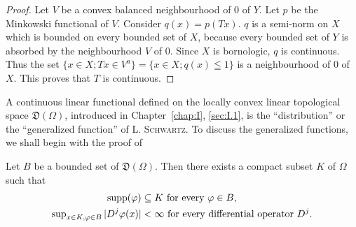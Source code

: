 \begin{proof}
 Let $V$ be a convex balanced neighbourhood of $0$ of $Y$. Let $p$ be the Minkowski functional of $V$. Consider $q(x) = p(Tx)$. $q$ is a semi-norm on $X$ which is bounded on every bounded set of $X$, because every bounded set of $Y$ is absorbed by the neighbourhood $V$ of $0$. Since $X$ is bornologic, $q$ is continuous. Thus the set $\{x \in X; Tx \in V^a\} = \{x \in X; q(x) \leqq 1\}$ is a neighbourhood of $0$ of $X$. This proves that $T$ is continuous. 
\end{proof}


\label{sec:I.8}

A continuous linear functional defined on the locally convex linear topological space $\mathfrak{D}(\Omega)$, introduced in Chapter~\ref{chap:I}, \ref{sec:I.1}, is the ``distribution'' or the ``generalized function'' of L. \textsc{Schwartz}. To discuss the generalized functions, we shall begin with the proof of 

\begin{theorem}\label{thm:I.8.Theorem.1} Let $B$ be a bounded set of $\mathfrak{D}(\Omega)$. Then there exists a compact subset $K$ of $\Omega$ such that 
\begin{align}
\operatorname{supp} (\varphi)& \subseteq K \text{ for every } \varphi \in B , \label{eq:I.8.1} \\
\sup\nolimits_{x \in K, \varphi \in B} | D ^{j} \varphi (x) |& < \infty \text{ for every differential operator } D ^{j}. \label{eq:I.8.2}
\end{align}
\end{theorem}

